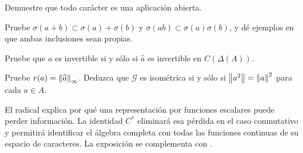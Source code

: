 \begin{ejercicio}\label{ej:v3-l24-3}
Demuestre que todo carácter es una aplicación abierta.
\end{ejercicio}


\begin{ejercicio}\label{ej:v3-l24-4}
Pruebe $\sigma(a+b)\subset\sigma(a)+\sigma(b)$ y $\sigma(ab)\subset\sigma(a)\sigma(b)$, y dé ejemplos en que ambas inclusiones sean propias.
\end{ejercicio}


\begin{ejercicio}\label{ej:v3-l24-5}
Pruebe que $a$ es invertible si y sólo si $\widehat a$ es invertible en $C(\Delta(A))$.
\end{ejercicio}


\begin{ejercicio}\label{ej:v3-l24-6}
Pruebe $r(a)=\left\lVert\widehat a\right\rVert_\infty$. Deduzca que $\mathcal G$ es isométrica si y sólo si $\left\lVert a^2\right\rVert=\left\lVert a\right\rVert^2$ para cada $a\in A$.
\end{ejercicio}


El radical explica por qué una representación por funciones escalares puede perder información. La identidad $C^*$ eliminará esa pérdida en el caso conmutativo y permitirá identificar el álgebra completa con todas las funciones continuas de su espacio de caracteres. La exposición se complementa con \cite{maxgelfand,murphy1990,rudin1991}.
